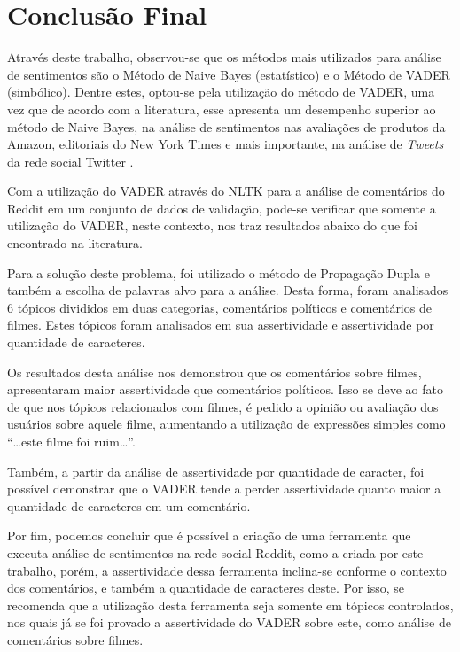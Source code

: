 \chapter{Conclusão Final}
\label{cap:conclusao}
Através deste trabalho, observou-se que os métodos mais utilizados para análise
de sentimentos são o Método de Naive Bayes (estatístico) e o Método de \ac{VADER} (simbólico). Dentre
estes, optou-se pela utilização do método de \ac{VADER}, uma vez que de acordo
com a literatura, esse apresenta um desempenho superior ao método de Naive
Bayes, na análise de sentimentos nas avaliações de
produtos da Amazon, editoriais do New York Times e mais importante, na análise
de \textit{Tweets} da rede social Twitter \cite{SentimentinSocialMedia}.

Com a utilização do \ac{VADER} através do \ac{NLTK} para a análise de
comentários do Reddit em um conjunto de dados de validação, pode-se verificar
que somente a utilização do \ac{VADER}, neste contexto, nos traz resultados
abaixo do que foi encontrado na literatura. 

Para a solução deste problema, foi
utilizado o método de Propagação Dupla e também a escolha de palavras alvo para
a análise. Desta forma, foram analisados 6 tópicos divididos em duas categorias,
comentários políticos e comentários de filmes. Estes tópicos foram analisados em
sua assertividade e assertividade por quantidade de caracteres.

Os resultados desta análise nos demonstrou que os comentários sobre filmes,
apresentaram maior assertividade que comentários políticos. Isso se deve ao fato
de que nos tópicos relacionados com filmes, é pedido a opinião
ou avaliação dos usuários sobre aquele filme, aumentando a utilização de
expressões simples como ``\ldots este filme foi ruim\ldots''.

Também, a partir da análise de assertividade por quantidade de caracter, foi
possível demonstrar que o \ac{VADER} tende a perder assertividade
quanto maior a quantidade de caracteres em um comentário.

Por fim, podemos concluir que é possível a criação de uma ferramenta que executa
análise de sentimentos na rede social Reddit, como a criada por este trabalho,
porém, a assertividade dessa ferramenta inclina-se conforme o contexto dos
comentários, e também a quantidade de caracteres deste. Por isso, se
recomenda que a utilização desta ferramenta seja somente em tópicos controlados,
nos quais já se foi provado a assertividade do \ac{VADER} sobre este, como análise de comentários sobre
filmes.

